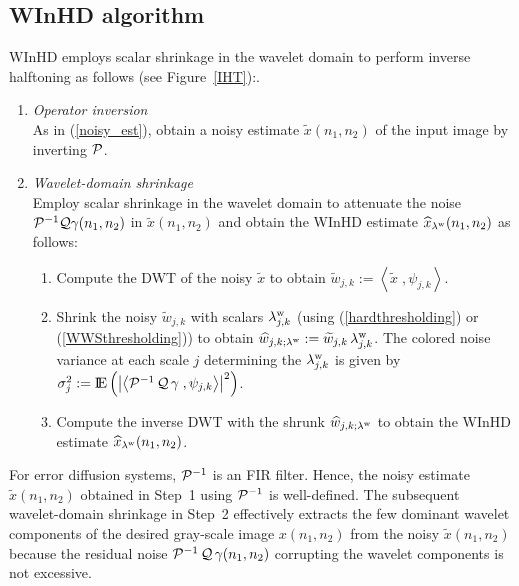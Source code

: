 \documentclass[11pt]{article}
\def\nnnx {n_1}
\def\nnny {n_2}
\def\nnbothk {k}
\newcommand{\expect}{{\rm I \mkern-2.5mu \nonscript\mkern-.5mu E}}
\def\cP { {\cal{P}} }
\def\cQ { {\cal{Q}} }
\begin{document}
\subsection{\mbox{WInHD} algorithm}
\label{winhdalgo}
\mbox{WInHD} employs scalar shrinkage in the
wavelet domain to perform inverse halftoning as follows (see
Figure~\ref{IHT}):.
\begin{enumerate} 
\item {\em Operator inversion}\\As in (\ref{noisy_est}), obtain a
noisy estimate $\widetilde{x}(\nnnx,\nnny)$ of the input image by inverting
$\cP$.
\item {\em Wavelet-domain shrinkage}\\ Employ scalar shrinkage in the
wavelet domain to attenuate the noise $\cP^{-1}\cQ\gamma(\nnnx,\nnny)$ in
$\widetilde{x}(\nnnx,\nnny)$ and obtain the \mbox{WInHD} estimate
$\widehat{x}_{\lambda^{\rm w}}(\nnnx,\nnny)$ as follows:
\begin{enumerate}
\item Compute the DWT of the noisy $\widetilde{x}$ to obtain $\widetilde{w}_{j,\nnbothk}:=\left\langle\widetilde{x}\;,\psi_{j,\nnbothk}\right\rangle$.
\item Shrink the noisy $\widetilde{w}_{j,\nnbothk}$ with scalars
$\lambda^{\rm w}_{j,\nnbothk}$ (using (\ref{hardthresholding}) or
(\ref{WWSthresholding})) to obtain
$\widehat{w}_{j,\nnbothk;\lambda^{\rm w}} :=
\widetilde{w}_{j,\nnbothk}\,\lambda^{\rm w}_{j,\nnbothk}$.  The
colored noise variance at each scale $j$ determining the $\lambda^{\rm
w}_{j,\nnbothk}$ is given by $\sigma_j^2 := \expect\left(\left|
\left\langle \cP^{-1}\,\cQ\,\gamma
\;,\psi_{j,\nnbothk}\right\rangle\right|^2\right)$.
\item Compute the inverse DWT with the shrunk
$\widehat{w}_{j,\nnbothk;\lambda^{\rm w}}$ to obtain the \mbox{WInHD} estimate
$\widehat{x}_{\lambda^{\rm w}}(\nnnx,\nnny)$.
\end{enumerate} 
\end{enumerate} 

For error diffusion systems, $\cP^{-1}$ is an FIR filter. Hence, the
noisy estimate $\widetilde{x}(\nnnx,\nnny)$ obtained in Step~1 using
$\cP^{-1}$ is well-defined. The subsequent wavelet-domain shrinkage in
Step~2 effectively extracts the few dominant wavelet components of the
desired gray-scale image $x(\nnnx,\nnny)$ from the noisy
$\widetilde{x}(\nnnx,\nnny)$ because the residual noise
$\cP^{-1}\,\cQ\, \gamma(\nnnx,\nnny)$ corrupting the wavelet
components is not excessive.
\end{document}

